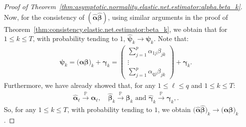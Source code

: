 \documentclass[
  12pt]{article}
\begin{document}
\begin{proof}[Proof of Theorem~\ref{thm:asymptotic.normality.elastic.net.estimator:alpha.beta_k}]
	Now, for the consistency of $(\widehat{\bm{\alpha}} \widehat{\bm{\beta}})$, using similar arguments in the proof of Theorem~\ref{thm:consistency.elastic.net.estimator:beta_k}, we obtain that for $1 \leq k \leq T$, with probability tending to $1$, $\widehat{\bm{\psi}}_{k}   \longrightarrow  \bm{\psi}_{k}$. %
	Note that:  
	\begin{align*}
		\bm{\psi}_{k} = \big( \bm{\alpha} \bm{\beta} \big)_{k}  +  \bm{\gamma
        }_{k}  
		= \left(
		\begin{array}{c}
			\sum_{j=1}^{p} \alpha_{1j} \beta_{jk} 
			\\
			\vdots 
			\\
			\sum_{j=1}^{p} \alpha_{q j} \beta_{jk} 
		\end{array}
		\right)  +  \bm{\gamma}_{k} 
		. 
	\end{align*}
	Furthermore, %
	we have already showed that, for any $1 \leq \ell \leq q$ and $1 \leq k \leq T$: 
	\begin{align*}
		\widehat{\bm{\alpha}}_{\ell}    \overset{\mathbb{P}}{\longrightarrow}  \bm{\alpha}_{\ell} , \quad  \widehat{\bm{\beta}}_{k}    \overset{\mathbb{P}}{\longrightarrow}  \bm{\beta}_{k}   \textrm{ and }  \widehat{\bm{\gamma}}_{k}    \overset{\mathbb{P}}{\longrightarrow}  \bm{\gamma}_{k},.
	\end{align*}
	So, for any $1 \leq  k  \leq  T$, with probability tending to $1$, we obtain  $\big( \widehat{\bm{\alpha}} \widehat{\bm{\beta}} \big)_{k}   \longrightarrow  \big( \bm{\alpha} \bm{\beta} \big)_{k} $. 
	
	\medskip
	

\end{proof}
\end{document}
